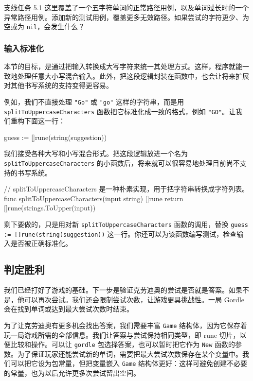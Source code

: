 \begin{infobox}{支线任务 5.1}
这里覆盖了一个五字符单词的正常路径用例，以及单词过长时的一个异常路径用例。添加新的测试用例，覆盖更多无效路径。如果尝试的字符更少、为空或为 \texttt{nil}，会发生什么？
\end{infobox}

\subsubsection*{输入标准化}

本节的目标，是通过把输入转换成大写字符来统一其处理方式。这样，程序就能一致地处理任意大小写混合输入。此外，把这段逻辑封装在函数中，也会让将来扩展对其他书写系统的支持变得更容易。

例如，我们不直接处理 \texttt{"Go"} 或 \texttt{"go"} 这样的字符串，而是用 \texttt{splitToUppercase\allowbreak Characters} 函数把它标准化成一致的格式，例如 \texttt{"GO"}。让我们重构下面这一行：

\begin{gocode}[]
guess := []rune(string(suggestion))
\end{gocode}

我们接受各种大写和小写混合形式。把这段逻辑放进一个名为 \texttt{splitToUppercase\allowbreak Characters} 的小函数后，将来就可以很容易地处理目前尚不支持的书写系统。

\begin{gocode}[title={代码清单 5.17 \texttt{game.go}：拆分字符}]
// splitToUppercaseCharacters 是一种朴素实现，用于把字符串转换成字符列表。
func splitToUppercaseCharacters(input string) []rune {
    return []rune(strings.ToUpper(input))
}
\end{gocode}

剩下要做的，只是用对新 \texttt{splitToUppercaseCharacters} 函数的调用，替换 \texttt{guess := []rune(string(suggestion))} 这一行。你还可以为该函数编写测试，检查输入是否被正确标准化。

\subsection{判定胜利}

我们已经打好了游戏的基础。下一步是验证克劳迪奥的尝试是否就是答案。如果不是，他可以再次尝试。我们还会限制尝试次数，让游戏更具挑战性。一局 Gordle 会在找到单词或达到最大尝试次数时结束。

为了让克劳迪奥有更多机会找出答案，我们需要丰富 \texttt{Game} 结构体，因为它保存着玩一局游戏所需的全部信息。我们让答案与尝试保持相同类型，即 rune 切片，以便比较和操作。可以让 \texttt{gordle} 包选择答案，也可以暂时把它作为 \texttt{New} 函数的参数。为了保证玩家还能尝试新的单词，需要把最大尝试次数保存在某个变量中。我们可以把它设为包常量，但把变量嵌入 \texttt{Game} 结构体更好：这样可避免创建不必要的常量，也为以后允许更多次尝试留出空间。

